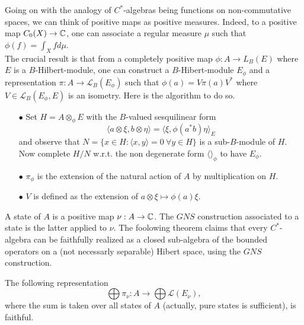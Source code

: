 Going on with the analogy of $C^*$-algebras being functions on non-commutative spaces, we can think of positive maps as positive measures. Indeed, to a positive map $C_0(X)\rightarrow \mathbb C$, one can associate a regular measure $\mu$ such that $\phi(f)=\int_X fd\mu$.\\

The crucial result is that from a completely positive map $\phi : A\rightarrow L_B(E) $ where $E$ is a $B$-Hilbert-module, one can construct a $B$-Hibert-module $E_\phi$ and a representation $ \pi : A\rightarrow \mathcal L_B(E_\phi)$ such that $\phi(a)=V\pi(a)V^*$ where $V\in \mathcal L_B(E_\phi,E)$ is an isometry. Here is the algorithm to do so.\\

\begin{itemize}
\item[$\bullet$] Set $H= A\otimes_\phi E$ with the $B$-valued sesquilinear form 
\[\langle a\otimes \xi, b\otimes \eta \rangle = \langle \xi, \phi(a^*b)\eta\rangle_E\]
and observe that $N=\{x\in H : \langle x,y\rangle =0\ \forall y\in H\}$ is a sub-$B$-module of $H$. Now complete $H/N$ w.r.t. the non degenerate form $\langle\rangle_\phi$ to have $E_\phi$.
\item[$\bullet$] $\pi_\phi$ is the extension of the natural action of $A$ by multiplication on $H$.
\item[$\bullet$] $V$ is defined as the extension of $a\otimes \xi \mapsto \phi(a)\xi$.\\
\end{itemize} 

A state of $A$ is a positive map $\nu : A\rightarrow \mathbb C$. The $GNS$ construction associated to a state is the latter applied to $\nu$. The foolowing theorem claims that every $C^*$-algebra can be faithfully realized as a closed sub-algebra of the bounded operators on a (not necessarly separable) Hibert space, using the $GNS$ construction.\\

\begin{thm}
The following representation
\[\bigoplus \pi_\nu : A\rightarrow \bigoplus \mathcal L(E_\nu),\]
where the sum is taken over all states of $A$ (actually, pure states is sufficient), is faithful.
\end{thm} 


